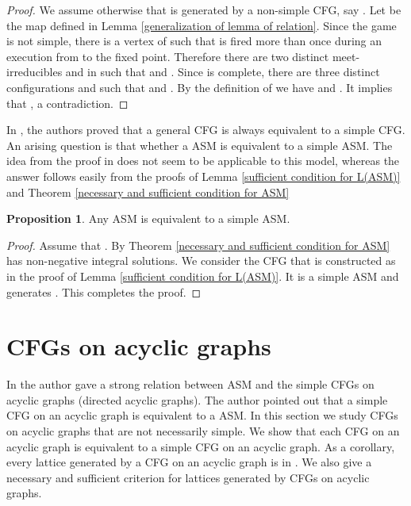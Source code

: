 \documentclass{article}
\theoremstyle{definition}
\newtheorem{prop}{Proposition}
\begin{document}
\begin{proof}
We assume otherwise that  is generated by a non-simple CFG, say . Let  be the map defined in Lemma \ref{generalization of lemma of relation}. Since the game is not simple, there is a vertex  of   such that  is fired more than once during an execution from  to the fixed point. Therefore there are two distinct meet-irreducibles  and  in  such that  and . Since  is complete, there are three distinct configurations  and  such that  and . By the definition of  we have  and . It implies that , a contradiction.
\end{proof}

In \cite{MVP01}, the authors proved that a general CFG  is always equivalent to a simple CFG. An arising question is that whether a ASM is equivalent to a simple ASM. The idea from the proof in \cite{MVP01} does not seem to be applicable to this model, whereas the answer follows easily from the proofs of Lemma \ref{sufficient condition for L(ASM)} and Theorem \ref{necessary and sufficient condition for ASM}
\begin{prop}
Any ASM is equivalent to a simple  ASM.
\end{prop}
\begin{proof}
Assume that . By Theorem \ref{necessary and sufficient condition for ASM}  has non-negative integral solutions. We consider the CFG that is constructed as in the proof of Lemma \ref{sufficient condition for L(ASM)}. It is a simple ASM and generates . This completes the proof.
\end{proof}
\section{CFGs on acyclic graphs}
\label{fifth section}
In \cite{Mag03} the author gave a strong relation between ASM and the simple CFGs on acyclic graphs (directed acyclic graphs). The author pointed out that a simple CFG on an acyclic graph is equivalent to a ASM. In this section we study CFGs on acyclic graphs that are not necessarily simple. We show that each CFG on an acyclic graph is equivalent to a simple CFG on an acyclic graph. As a corollary, every lattice generated by a CFG on an acyclic graph is in . We also give a necessary and sufficient criterion for lattices generated by CFGs on acyclic graphs.
\end{document}
